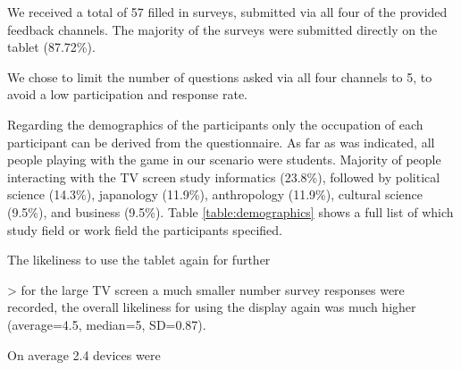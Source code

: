 









	We received a total of 57 filled in surveys, submitted via all four of the provided feedback channels. The majority of the surveys were submitted directly on the tablet (87.72\%). 


	We chose to limit the number of questions asked via all four channels to 5, to avoid a low participation and response rate. 

	Regarding the demographics of the participants only the occupation of each participant can be derived from the questionnaire. As far as was indicated, all people playing with the game in our scenario were students. Majority of people interacting with the TV screen study informatics (23.8\%), followed by political science (14.3\%), japanology (11.9\%), anthropology (11.9\%), cultural science (9.5\%), and business (9.5\%). Table \ref{table:demographics} shows a full list of which study field or work field the participants specified.

	The likeliness to use the tablet again for further 

		> for the large TV screen a much smaller number survey responses were recorded, the overall likeliness for using the display again was much higher (average=4.5, median=5, SD=0.87).



	On average 2.4 devices were 

